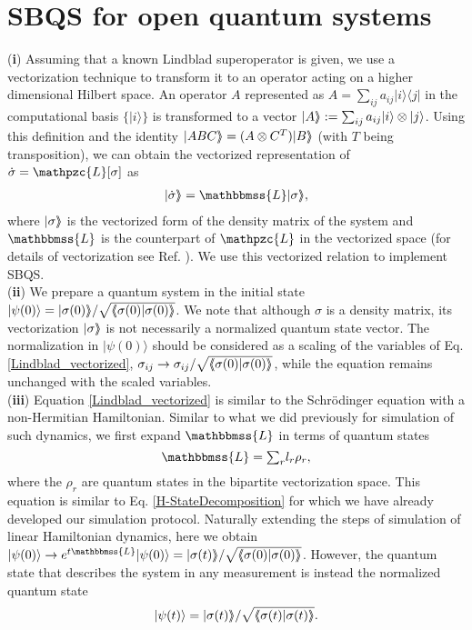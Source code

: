 \documentclass[aps,pra,twocolumn,floatfix,groupedaddress,superscriptaddress,nofootinbib,notitlepage]{revtex4-2}
\def \llangle{{\langle\hskip-1mm\langle}}
\def \rrangle{{\rangle\hskip-1mm\rangle}}
\begin{document}
\section{SBQS for open quantum systems}

(\textbf{i}) Assuming that a known Lindblad superoperator is given, we use a vectorization technique to transform it to an operator acting on a higher dimensional Hilbert space. An operator $A$ represented as $A=\sum_{ij} a_{ij} |i\rangle\langle j|$ in the computational basis $\{|i\rangle\}$ is transformed to a vector $|A\rrangle:=\sum_{ij} a_{ij}|i\rangle \otimes| j\rangle$. Using this definition and the identity $|A B C\rrangle= (A\otimes C^{T})|B\rrangle$ (with $T$ being transposition), we can obtain the vectorized representation of $\dot{\sigma} = \mathpzc{L}[\sigma]$ as  
\begin{align}
\label{Lindblad_vectorized}
|\dot{\sigma}\rrangle = \mathbbmss{L}|\sigma\rrangle,
\end{align}
where $|\sigma\rrangle$ is the vectorized form of the density matrix of the system and $\mathbbmss{L}$ is the counterpart of $\mathpzc{L}$ in the vectorized space (for details of vectorization see Ref. \cite{DQM}). We use this vectorized relation to implement SBQS.\\

(\textbf{ii}) We prepare a quantum system in the initial state $|\psi(0)\rangle=|\sigma(0)\rrangle / \sqrt{\llangle \sigma(0)|\sigma(0)\rrangle}$. We note that although $\sigma$ is a density matrix, its vectorization $|\sigma\rrangle$ is not necessarily a normalized quantum state vector. The normalization in $|\psi(0)\rangle$ should be considered as a scaling of the variables of Eq. \eqref{Lindblad_vectorized}, $\sigma_{ij} \to \sigma_{ij}/\sqrt{\llangle \sigma(0)|\sigma(0)\rrangle}$, while the equation remains unchanged with the scaled variables.\\

(\textbf{iii}) Equation \eqref{Lindblad_vectorized} is similar to the Schr\"{o}dinger equation with a non-Hermitian Hamiltonian. Similar to what we did previously for simulation of such dynamics, we first expand $\mathbbmss{L}$ in terms of quantum states 
\begin{equation}
\mathbbmss{L}=\textstyle{\sum}_{r} l_{r} \rho_{r},
\end{equation}
where the $\rho_{r}$ are quantum states in the bipartite vectorization space. This equation is similar to Eq. \eqref{H-StateDecomposition} for which we have already developed our simulation protocol. Naturally extending the steps of simulation of linear Hamiltonian dynamics, here we obtain 
$|\psi(0)\rangle \to e^{t \mathbbmss{L}} |\psi(0)\rangle =|\sigma(t)\rrangle/{\sqrt{\llangle \sigma(0)|\sigma(0)\rrangle}}$. 
However, the quantum state that describes the system in any measurement is instead the normalized quantum state 
\begin{align}
|\psi(t)\rangle=|\sigma(t)\rrangle/\sqrt{\llangle \sigma(t)|\sigma(t)\rrangle}.
\end{align}
\\
\end{document}
